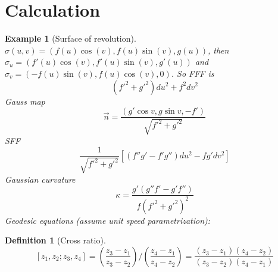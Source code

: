 \documentclass{article}
\theoremstyle{definition}
\newtheorem{defn}{Definition}[section]
\theoremstyle{remark}
\theoremstyle{plain}
\newtheorem{example}{Example}
\theoremstyle{definition}
\begin{document}
\section{Calculation}
\begin{example}[Surface of revolution]
    $\sigma(u,v)=(f(u)\cos(v),f(u)\sin(v),g(u))$, then $\sigma_u=(f'(u)\cos(v),f'(u)\sin(v),g'(u))$
    and $\sigma_v=(-f(u)\sin(v),f(u)\cos(v),0)$. So FFF is $$(f'^2+g'^2)du^2+f^2dv^2$$
    Gauss map
    \[\vec n=\dfrac{(g'\cos v, g\sin v, -f')}{\sqrt{f'^2+g'^2}}\]
    SFF
    \[\dfrac{1}{\sqrt{f'^2+g'^2}}[(f''g'-f'g'')du^2-fg'dv^2]\]
    Gaussian curvature
    \[\kappa=\dfrac{g'(g''f'-g'f'')}{f(f'^2+g'^2)^2}\]
    Geodesic equations (assume unit speed parametrization):
    
\end{example}
\begin{defn}[Cross ratio]
    \[[z_1,z_2;z_3,z_4]=\left(\dfrac{z_3-z_1}{z_3-z_2}\right)\Big/\left(\dfrac{z_4-z_1}{z_4-z_2}\right)=\dfrac{(z_3-z_1)(z_4-z_2)}{(z_3-z_2)(z_4-z_1)}\]
\end{defn}
\end{document}
